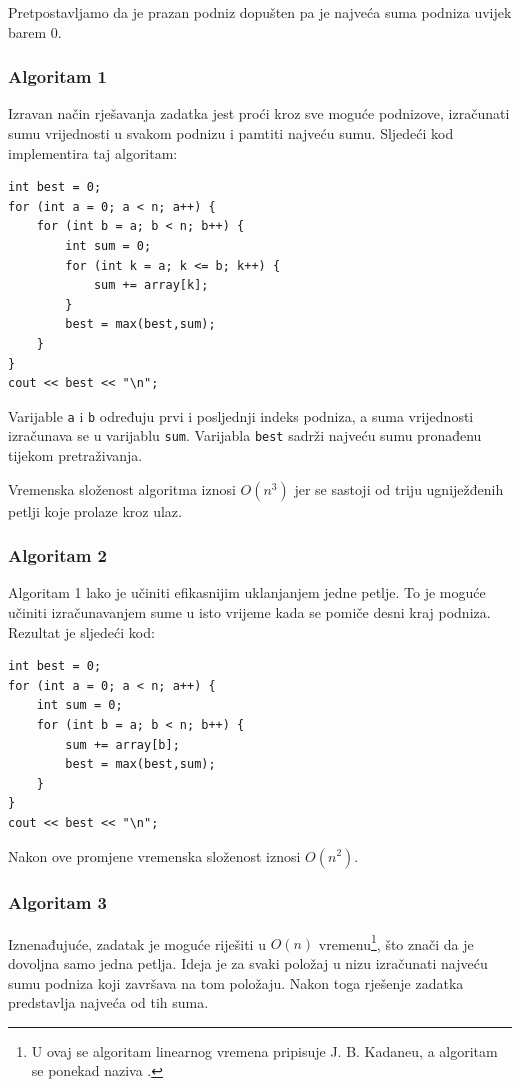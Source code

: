 Pretpostavljamo da je prazan podniz dopušten
pa je najveća suma podniza uvijek barem $0$.

\subsubsection{Algoritam 1}

Izravan način rješavanja zadatka
jest proći kroz sve moguće podnizove,
izračunati sumu vrijednosti u svakom podnizu i pamtiti
najveću sumu.
Sljedeći kod implementira taj algoritam:

\begin{lstlisting}
int best = 0;
for (int a = 0; a < n; a++) {
    for (int b = a; b < n; b++) {
        int sum = 0;
        for (int k = a; k <= b; k++) {
            sum += array[k];
        }
        best = max(best,sum);
    }
}
cout << best << "\n";
\end{lstlisting}

Varijable \texttt{a} i \texttt{b} određuju prvi i
posljednji indeks podniza,
a suma vrijednosti izračunava se u varijablu \texttt{sum}.
Varijabla \texttt{best} sadrži najveću sumu pronađenu tijekom pretraživanja.

Vremenska složenost algoritma iznosi $O(n^3)$
jer se sastoji od triju ugniježđenih petlji
koje prolaze kroz ulaz.

\subsubsection{Algoritam 2}

Algoritam 1 lako je učiniti efikasnijim
uklanjanjem jedne petlje.
To je moguće učiniti izračunavanjem sume u isto
vrijeme kada se pomiče desni kraj podniza.
Rezultat je sljedeći kod:

\begin{lstlisting}
int best = 0;
for (int a = 0; a < n; a++) {
    int sum = 0;
    for (int b = a; b < n; b++) {
        sum += array[b];
        best = max(best,sum);
    }
}
cout << best << "\n";
\end{lstlisting}
Nakon ove promjene vremenska složenost iznosi $O(n^2)$.

\subsubsection{Algoritam 3}

Iznenađujuće, zadatak je moguće riješiti
u $O(n)$ vremenu\footnote{U \cite{ben86} ovaj se algoritam linearnog vremena
pripisuje J. B. Kadaneu, a algoritam se ponekad
naziva  .}, što znači
da je dovoljna samo jedna petlja.
Ideja je za svaki položaj u nizu izračunati
najveću sumu podniza koji završava na tom položaju.
Nakon toga rješenje zadatka predstavlja
najveća od tih suma.

